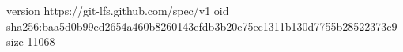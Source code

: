 version https://git-lfs.github.com/spec/v1
oid sha256:baa5d0b99ed2654a460b8260143efdb3b20e75ec1311b130d7755b28522373c9
size 11068

